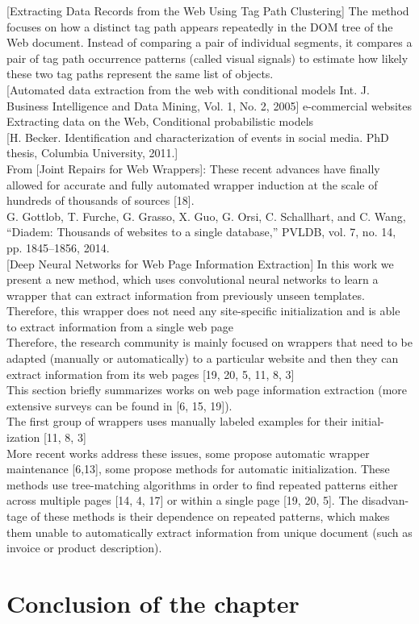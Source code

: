 [Extracting Data Records from the Web Using Tag Path Clustering]
The method focuses on how a distinct tag path appears repeatedly in the DOM tree of the Web document. Instead of comparing a pair of individual segments, it compares a pair of tag path occurrence patterns (called visual signals) to estimate how likely these two tag paths represent the same list of objects.\\

[Automated data extraction from the web with conditional models Int. J. Business Intelligence and Data Mining, Vol. 1, No. 2, 2005] e-commercial websites Extracting data on the Web, Conditional probabilistic models\\


[H. Becker. Identification and characterization of events in social media. PhD thesis, Columbia University, 2011.]\\

From [Joint Repairs for Web Wrappers]:
These recent advances have finally allowed for accurate and fully automated wrapper induction at the scale of hundreds of thousands of sources [18].\\
[18] G. Gottlob, T. Furche, G. Grasso, X. Guo, G. Orsi, C. Schallhart, and C. Wang, “Diadem: Thousands of websites to a single database,” PVLDB, vol. 7, no. 14, pp. 1845–1856, 2014.\\

[Deep Neural Networks for Web Page Information Extraction] In this work we present a new method, which uses convolutional neural networks to learn a wrapper that can extract information from previously unseen templates. Therefore, this wrapper does not need any site-specific initialization and is able to extract information from a single web page\\ Therefore, the research community is mainly focused on wrappers that need to be adapted (manually or automatically) to a particular website and then they can extract information from its web pages [19, 20, 5, 11, 8, 3]\\
This section briefly summarizes works on web page information extraction (more extensive surveys can be found in [6, 15, 19]). \\
The first group of wrappers uses manually labeled examples for their initial- ization [11, 8, 3]\\
More recent works address these issues, some propose automatic wrapper maintenance [6,13], some propose methods for automatic initialization. These methods use tree-matching algorithms in order to find repeated patterns either across multiple pages [14, 4, 17] or within a single page [19, 20, 5]. The disadvan- tage of these methods is their dependence on repeated patterns, which makes them unable to automatically extract information from unique document (such as invoice or product description).\\




\section*{Conclusion of the chapter}
